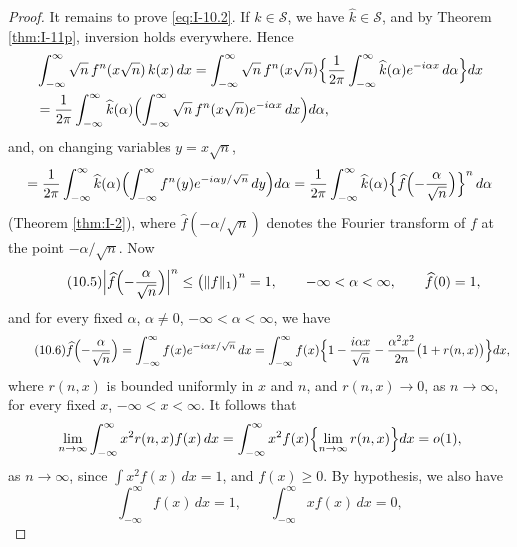 \begin{proof}
It remains to prove \eqref{eq:I-10.2}. If $k\in\mathcal S$, we have $\widehat k\in\mathcal S$, and by Theorem \ref{thm:I-11p}, inversion holds everywhere. Hence
\begin{equation*}
\begin{aligned}
&\int_{-\infty}^{\infty}\sqrt n\,f^n(x\sqrt n)\,k(x)\,dx = \int_{-\infty}^{\infty}\sqrt n\,f^n(x\sqrt n)\Bigl\{\frac{1}{2\pi}\int_{-\infty}^{\infty}\widehat k(\alpha)e^{-i\alpha x}\,d\alpha\Bigr\}dx\\
&= \frac{1}{2\pi}\int_{-\infty}^{\infty}\widehat k(\alpha)\Bigl(\int_{-\infty}^{\infty}\sqrt n\,f^n(x\sqrt n)e^{-i\alpha x}\,dx\Bigr)d\alpha,
\end{aligned}
\end{equation*}
and, on changing variables $y=x\sqrt n$,
\begin{equation*}
=\frac{1}{2\pi}\int_{-\infty}^{\infty}\widehat k(\alpha)\Bigl(\int_{-\infty}^{\infty}f^n(y)e^{-i\alpha y/\sqrt n}\,dy\Bigr)d\alpha
=\frac{1}{2\pi}\int_{-\infty}^{\infty}\widehat k(\alpha)\Bigl\{\widehat f\Bigl(-\frac{\alpha}{\sqrt n}\Bigr)\Bigr\}^n\,d\alpha
\end{equation*}
(Theorem \ref{thm:I-2}), where $\widehat f(-\alpha/\sqrt n)$ denotes the Fourier transform of $f$ at the point $-\alpha/\sqrt n$. Now
\begin{equation}\label{eq:I-10.5}\tag{10.5}
\Bigl|\widehat f\Bigl(-\frac{\alpha}{\sqrt n}\Bigr)\Bigr|^n
\le\bigl(\|f\|_1\bigr)^n=1,\qquad-\infty<\alpha<\infty,\qquad \widehat f(0)=1,
\end{equation}
and for every fixed $\alpha$, $\alpha\neq 0$, $-\infty<\alpha<\infty$, we have
\begin{equation}\label{eq:I-10.6}\tag{10.6}
\widehat f\Bigl(-\frac{\alpha}{\sqrt n}\Bigr)
=\int_{-\infty}^{\infty}f(x)e^{-i\alpha x/\sqrt n}\,dx
=\int_{-\infty}^{\infty}f(x)\Bigl\{1-\frac{i\alpha x}{\sqrt n}-\frac{\alpha^{2}x^{2}}{2n}\bigl(1+r(n,x)\bigr)\Bigr\}dx,
\end{equation}
where $r(n,x)$ is bounded uniformly in $x$ and $n$, and $r(n,x)\to 0$, as $n\to\infty$, for every fixed $x$, $-\infty<x<\infty$. It follows that
\begin{equation*}
\lim_{n\to\infty}\int_{-\infty}^{\infty}x^{2}r(n,x)f(x)\,dx
=\int_{-\infty}^{\infty}x^{2}f(x)\Bigl\{\lim_{n\to\infty}r(n,x)\Bigr\}dx
=o(1),
\end{equation*}
as $n\to\infty$, since $\int x^{2}f(x)\,dx=1$, and $f(x)\ge 0$. By hypothesis, we also have
\begin{equation*}
\int_{-\infty}^{\infty}f(x)\,dx=1,\qquad \int_{-\infty}^{\infty}xf(x)\,dx=0,

\end{equation*}
\end{proof}
